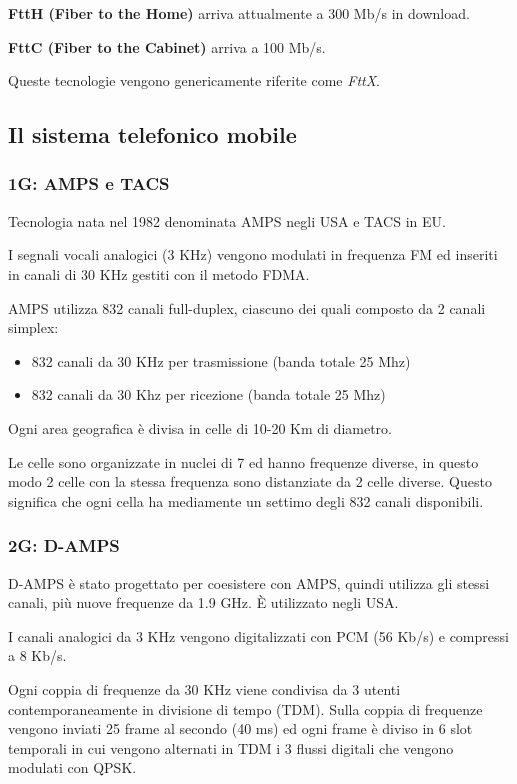             \textbf{FttH (Fiber to the Home)} arriva attualmente a 300 Mb/s in download.

            \textbf{FttC (Fiber to the Cabinet)} arriva a 100 Mb/s.

            Queste tecnologie vengono genericamente riferite come \textit{FttX}.

    \subsection{Il sistema telefonico mobile}
        \subsubsection{1G: AMPS e TACS}
            Tecnologia nata nel 1982 denominata AMPS negli USA e TACS in EU.
        
            I segnali vocali analogici (3 KHz) vengono modulati in frequenza FM ed inseriti in canali di 30 KHz gestiti con il metodo FDMA.

            AMPS utilizza 832 canali full-duplex, ciascuno dei quali composto da 2 canali simplex:
            \begin{itemize}
                \item 832 canali da 30 KHz per trasmissione (banda totale 25 Mhz)
                \item 832 canali da 30 Khz per ricezione (banda totale 25 Mhz)
            \end{itemize}

            Ogni area geografica è divisa in celle di 10-20 Km di diametro.

            Le celle sono organizzate in nuclei di 7 ed hanno frequenze diverse, in questo modo 2 celle con la stessa frequenza sono distanziate da 2 celle diverse. Questo significa che ogni cella ha mediamente un settimo degli 832 canali disponibili.

        \subsubsection{2G: D-AMPS}
            D-AMPS è stato progettato per coesistere con AMPS, quindi utilizza gli stessi canali, più nuove frequenze da 1.9 GHz. È utilizzato negli USA.
        
            I canali analogici da 3 KHz vengono digitalizzati con PCM (56 Kb/s) e compressi a 8 Kb/s.

            Ogni coppia di frequenze da 30 KHz viene condivisa da 3 utenti contemporaneamente in divisione di tempo (TDM). Sulla coppia di frequenze vengono inviati 25 frame al secondo (40 ms) ed ogni frame è diviso in 6 slot temporali in cui vengono alternati in TDM i 3 flussi digitali che vengono modulati con QPSK.

